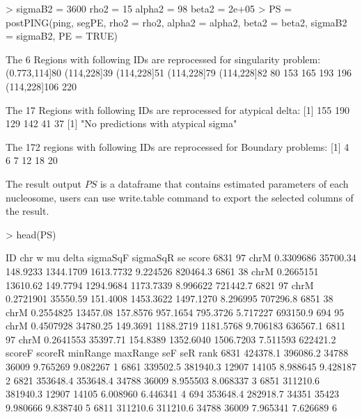 \documentclass[11pt]{article}
\begin{document}
\begin{Schunk}
\begin{Sinput}
> {
     sigmaB2 = 3600
     rho2 = 15
     alpha2 = 98
     beta2 = 2e+05
 }
> PS = postPING(ping, segPE, rho2 = rho2, alpha2 = alpha2, beta2 = beta2, 
     sigmaB2 = sigmaB2, PE = TRUE)
\end{Sinput}
\begin{Soutput}
 The 6 Regions with following IDs are reprocessed for singularity problem: 
(0.773,114]80   (114,228]39   (114,228]51   (114,228]79   (114,228]82 
           80           153           165           193           196 
 (114,228]106 
          220 

 The 17 Regions with following IDs are reprocessed for atypical delta: 
[1] 155 190 129 142  41  37
[1] "No predictions with atypical sigma"

 The 172 regions with following IDs are reprocessed for Boundary problems: 
[1]  4  6  7 12 18 20
\end{Soutput}
\end{Schunk}
The result output $PS$ is a dataframe that contains estimated parameters of each nucleosome, users can use write.table command to export the selected columns of the result.
\begin{Schunk}
\begin{Sinput}
> head(PS)
\end{Sinput}
\begin{Soutput}
     ID  chr         w       mu    delta  sigmaSqF  sigmaSqR       se    score
6831 97 chrM 0.3309686 35700.34 148.9233 1344.1709 1613.7732 9.224526 820464.3
6861 38 chrM 0.2665151 13610.62 149.7794 1294.9684 1173.7339 8.996622 721442.7
6821 97 chrM 0.2721901 35550.59 151.4008 1453.3622 1497.1270 8.296995 707296.8
6851 38 chrM 0.2554825 13457.08 157.8576  957.1654  795.3726 5.717227 693150.9
694  95 chrM 0.4507928 34780.25 149.3691 1188.2719 1181.5768 9.706183 636567.1
6811 97 chrM 0.2641553 35397.71 154.8389 1352.6040 1506.7203 7.511593 622421.2
       scoreF   scoreR minRange maxRange      seF      seR rank
6831 424378.1 396086.2    34788    36009 9.765269 9.082267    1
6861 339502.5 381940.3    12907    14105 8.988645 9.428187    2
6821 353648.4 353648.4    34788    36009 8.955503 8.068337    3
6851 311210.6 381940.3    12907    14105 6.008960 6.446341    4
694  353648.4 282918.7    34351    35423 9.980666 9.838740    5
6811 311210.6 311210.6    34788    36009 7.965341 7.626689    6
\end{Soutput}
\end{Schunk}
\end{document}
